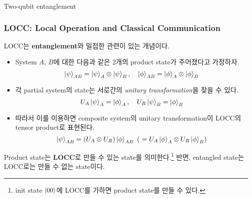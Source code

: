 \documentclass[9pt]{beamer}
\begin{document}
    \begin{section}{Two-qubit entanglement}
        \begin{frame}
            \frametitle{LOCC: Local Operation and Classical Communication}
            LOCC는 \textbf{entanglement}와 밀접한 관련이 있는 개념이다. 
            \begin{itemize}
                \item System $A$, $B$에 대한 다음과 같은 2개의 product state가 주어졌다고 가정하자.
                \begin{equation*}
                    \ket{\psi}_{AB} = \ket{\psi}_A \otimes \ket{\psi}_B,\quad \ket{\phi}_{AB} = \ket{\phi}_A \otimes \ket{\phi}_B
                \end{equation*}
                \item 각 partial system의 state는 서로간의 \textit{unitary transformation}을 찾을 수 있다.
                \begin{equation*}
                    U_A\ket{\psi}_{A} = \ket{\phi}_{A}, \quad U_B\ket{\psi}_{B} = \ket{\phi}_{B}
                \end{equation*}
                \item 따라서 이를 이용하면 composite system의 unitary transformation이 LOCC의 tensor product로 표현된다.
                \begin{equation*}
                    \ket{\psi}_{AB} = (U_A \otimes U_B) \ket{\phi}_{AB}\ (\ = U_A \ket{\phi}_A \otimes U_B \ket{\phi}_B )
                \end{equation*}
            \end{itemize}
            \begin{definition}
                \alert{Product state}는 \textbf{LOCC}로 만들 수 있는 state를 의미한다.\footnote{init state $\ket{00}$에 LOCC를 가하면 product state를 만들 수 있다.} 반면, \alert{entangled state}는 LOCC로는 만들 수 없는 state이다. 
            \end{definition}
        \end{frame}


\end{section}
\end{document}
